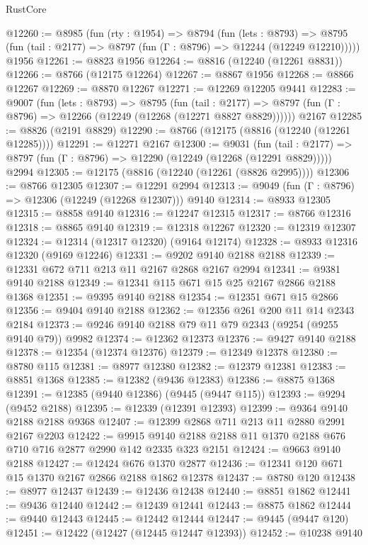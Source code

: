 \begin{lexlean}{RustCore}
\begin{coremodule}
@12260 := @8985
    (fun (rty : @1954) =>
    @8794
      (fun (lets : @8793) =>
      @8795 (fun (tail : @2177) => @8797 (fun (Γ : @8796) => @12244 (@12249 @12210)))))
    @1956
@12261 := @8823 @1956
@12264 := @8816 (@12240 (@12261 @8831))
@12266 := @8766 (@12175 @12264)
@12267 := @8867 @1956
@12268 := @8866 @12267
@12269 := @8870 @12267
@12271 := @12269 @12205 @9441
@12283 := @9007
    (fun (lets : @8793) =>
    @8795
      (fun (tail : @2177) =>
      @8797 (fun (Γ : @8796) => @12266 (@12249 (@12268 (@12271 @8827 @8829))))))
    @2167
@12285 := @8826 (@2191 @8829)
@12290 := @8766 (@12175 (@8816 (@12240 (@12261 @12285))))
@12291 := @12271 @2167
@12300 := @9031
    (fun (tail : @2177) => @8797 (fun (Γ : @8796) => @12290 (@12249 (@12268 (@12291 @8829)))))
    @2994
@12305 := @12175 (@8816 (@12240 (@12261 (@8826 @2995))))
@12306 := @8766 @12305
@12307 := @12291 @2994
@12313 := @9049 (fun (Γ : @8796) => @12306 (@12249 (@12268 @12307))) @9140
@12314 := @8933 @12305
@12315 := @8858 @9140
@12316 := @12247 @12315
@12317 := @8766 @12316
@12318 := @8865 @9140
@12319 := @12318 @12267
@12320 := @12319 @12307
@12324 := @12314 (@12317 @12320) (@9164 @12174)
@12328 := @8933 @12316 @12320 (@9169 @12246)
@12331 := @9202 @9140 @2188 @2188
@12339 := @12331 @672 @711 @213 @11 @2167 @2868 @2167 @2994
@12341 := @9381 @9140 @2188
@12349 := @12341 @115 @671 @15 @25 @2167 @2866 @2188 @1368
@12351 := @9395 @9140 @2188
@12354 := @12351 @671 @15 @2866
@12356 := @9404 @9140 @2188
@12362 := @12356 @261 @200 @11 @14 @2343 @2184
@12373 := @9246 @9140 @2188 @79 @11 @79 @2343 (@9254 (@9255 @9140 @79)) @9982
@12374 := @12362 @12373
@12376 := @9427 @9140 @2188
@12378 := @12354 (@12374 @12376)
@12379 := @12349 @12378
@12380 := @8780 @115
@12381 := @8977 @12380
@12382 := @12379 @12381
@12383 := @8851 @1368
@12385 := @12382 (@9436 @12383)
@12386 := @8875 @1368
@12391 := @12385 (@9440 @12386) (@9445 (@9447 @115))
@12393 := @9294 (@9452 @2188)
@12395 := @12339 (@12391 @12393)
@12399 := @9364 @9140 @2188 @2188 @9368
@12407 := @12399 @2868 @711 @213 @11 @2880 @2991 @2167 @2203
@12422 := @9915 @9140 @2188 @2188 @11 @1370 @2188 @676 @710 @716 @2877 @2990 @142 @2335 @323 @2151
@12424 := @9663 @9140 @2188
@12427 := @12424 @676 @1370 @2877
@12436 := @12341 @120 @671 @15 @1370 @2167 @2866 @2188 @1862 @12378
@12437 := @8780 @120
@12438 := @8977 @12437
@12439 := @12436 @12438
@12440 := @8851 @1862
@12441 := @9436 @12440
@12442 := @12439 @12441
@12443 := @8875 @1862
@12444 := @9440 @12443
@12445 := @12442 @12444
@12447 := @9445 (@9447 @120)
@12451 := @12422 (@12427 (@12445 @12447 @12393))
@12452 := @10238 @9140

\end{coremodule}
\end{lexlean}
